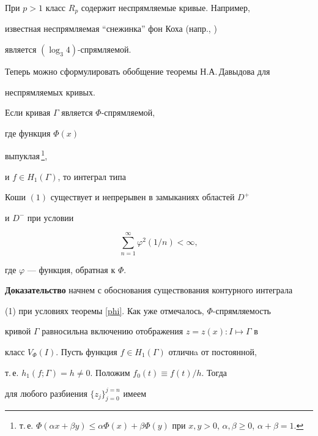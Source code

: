 При $p>1$ класс $R_p$ содержит неспрямляемые кривые. Например,


известная неспрямляемая ``снежинка'' фон Коха (напр., \cite{F})


является $(\log_{3}{4})$-спрямляемой.





Теперь можно сформулировать обобщение теоремы Н.А.\,Давыдова для


неспрямляемых кривых.





\begin{thm}\label{phi}


Если кривая $\Gamma$ является $\Phi$-спрямляемой,


где функция $\Phi (x)$


выпуклая\,\footnote{т.\,е. $\Phi (\alpha x + \beta y)\le \alpha \Phi (x) +


\beta \Phi (y)$ при $x,y>0$, $\alpha,\beta\ge0$, $\alpha+\beta = 1$.},


и $f\in H_{1}(\Gamma)$, то интеграл типа 


Коши $(1)$ существует и непрерывен в замыканиях областей $D^+$


и $D^-$ при условии


\begin{equation}


\sum_{n=1}^{\infty}{\varphi^{2}(1/n)} < \infty,


\end{equation}


где $\varphi$ --- функция, обратная к $\Phi$.


\end{thm}





{\bf Доказательство} начнем с обоснования существования контурного интеграла


(1) при условиях теоремы \ref{phi}. Как уже отмечалось, $\Phi$-спрямляемость


кривой $\Gamma$ равносильна включению отображения $z=z(x):I\mapsto\Gamma$ в


класс $V_{\Phi}(I)$. Пусть функция $f\in H_{1}(\Gamma)$ отличнa от постоянной,


т.\,е. $h_{1}(f;\Gamma) = h\not= 0.$ Положим $f_{0}(t)\equiv f(t)/h$. Тогда


для любого разбиения $\{z_j\}_{j=0}^{j=n}$ имеем


